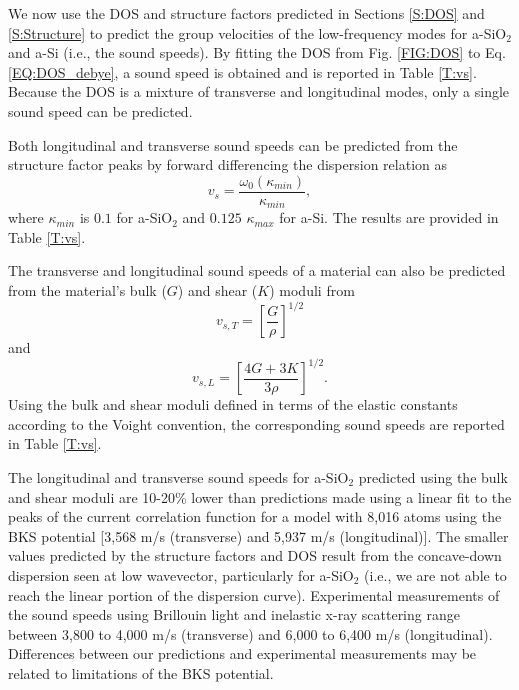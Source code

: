 \documentclass[aps,prb,onecolumn,preprint,superscriptaddress,footinbib,amsmath,amssymb,floatfix]{revtex4}
\begin{document}
We now use the DOS and structure factors predicted in
Sections \ref{S:DOS} and \ref{S:Structure} to
predict the group velocities of the low-frequency modes for
a-SiO$_2$ and a-Si (i.e., the sound speeds). By fitting the DOS
from Fig. \ref{FIG:DOS} to Eq. \eqref{EQ:DOS_debye}, 
a sound speed is obtained and is 
reported in Table \ref{T:vs}. Because the DOS is a mixture of
transverse and longitudinal modes, only a single sound speed can be
predicted.

Both longitudinal and transverse sound speeds can be predicted from
the structure factor peaks by forward differencing the dispersion relation as
\begin{equation}\label{EQ:vs_dwdk}
v_{s} = \frac{\omega_0(\kappa_{min})}{\kappa_{min}},
\end{equation}
where $\kappa_{min}$ is $0.1$ for a-SiO$_2$ and $0.125$ $\kappa_{max}$ 
for a-Si. The results are provided in Table \ref{T:vs}.

The transverse and longitudinal sound speeds of a material can
also be predicted from the material's bulk ($G$) and
shear ($K$) moduli from
\begin{equation}\label{EQ:vs_T_elas}
v_{s,T} = \left[\frac{G}{\rho}\right]^{1/2}
\end{equation}
and
\begin{equation}\label{EQ:vs_L_elas}
v_{s,L} = \left[\frac{4G + 3K}{3\rho}\right]^{1/2}.
\end{equation}
Using the bulk and shear moduli defined in terms of the elastic
constants according to the Voight convention,\cite{gale_general_2003} 
the corresponding sound speeds are reported in Table \ref{T:vs}.
 
The longitudinal and transverse sound speeds for 
a-SiO$_2$ predicted using the bulk and shear moduli are 10-20\%  
lower than predictions made using a linear fit to the peaks of the 
current correlation function for a model with 
8,016 atoms using the BKS potential 
[3,568 m/s (transverse) and 5,937 m/s (longitudinal)]. The smaller 
values predicted by the structure factors and DOS 
result from the concave-down dispersion seen at low 
wavevector, particularly for a-SiO$_2$ (i.e., we are not able to reach 
the linear portion of the dispersion curve).\cite{horbach_high_2001} 
Experimental measurements of the 
sound speeds using Brillouin light and inelastic x-ray 
scattering range between 3,800 to 4,000 m/s (transverse) and 
6,000 to 6,400 m/s (longitudinal).
\cite{vacher_ultrasonic_1981,benassi_evidence_1996,
ruocco_high-frequency_2001,polian_elastic_2002,
ruzicka_evidence_2004} Differences between our predictions and 
experimental measurements may be related to limitations of the 
BKS potential.
\end{document}
